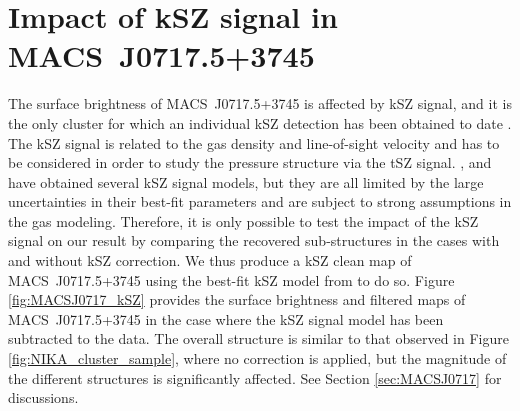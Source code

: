 \documentclass[twocolumn,traditabstract]{aa}
\begin{document}
\section{Impact of kSZ signal in \mbox{MACS~J0717.5+3745}}\label{sec:Impact_of_kSZ}
The surface brightness of \mbox{MACS~J0717.5+3745} is affected by kSZ signal, and it is the only cluster for which an individual kSZ detection has been obtained to date \citep[][]{Mroczkowski2012,Sayers2013,Adam2016b}. The kSZ signal is related to the gas density and line-of-sight velocity and has to be considered in order to study the pressure structure via the tSZ signal. \cite{Mroczkowski2012}, \cite{Sayers2013} and \cite{Adam2016b} have obtained several kSZ signal models, but they are all limited by the large uncertainties in their best-fit parameters and are subject to strong assumptions in the gas modeling. Therefore, it is only possible to test the impact of the kSZ signal on our result by comparing the recovered sub-structures in the cases with and without kSZ correction. We thus produce a kSZ clean map of \mbox{MACS~J0717.5+3745} using the best-fit kSZ model from \cite{Adam2016b} to do so. Figure \ref{fig:MACSJ0717_kSZ} provides the surface brightness and filtered maps of \mbox{MACS~J0717.5+3745} in the case where the kSZ signal model has been subtracted to the data. The overall structure is similar to that observed in Figure \ref{fig:NIKA_cluster_sample}, where no correction is applied, but the magnitude of the different structures is significantly affected. See Section \ref{sec:MACSJ0717} for discussions.
\end{document}
